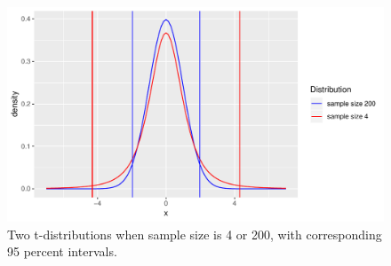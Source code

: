 \documentclass[]{book}\usepackage[]{graphicx}\usepackage[]{color}
\makeatletter
\def\maxwidth{ %
  \ifdim\Gin@nat@width>\linewidth
    \linewidth
  \else
    \Gin@nat@width
  \fi
}
\newenvironment{knitrout}{}{} %
\makeatother
\begin{document}



\begin{knitrout}
\color{fgcolor}\begin{figure}

{\centering \includegraphics[width=\maxwidth]{figure/inf_10-1} 

}

\caption[Two t-distributions when sample size is 4 or 200, with corresponding 95 percent intervals]{Two t-distributions when sample size is 4 or 200, with corresponding 95 percent intervals.}\label{fig:inf_10}
\end{figure}


\end{knitrout}
\end{document}
